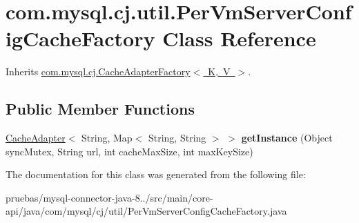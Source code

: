 \hypertarget{classcom_1_1mysql_1_1cj_1_1util_1_1_per_vm_server_config_cache_factory}{}\section{com.\+mysql.\+cj.\+util.\+Per\+Vm\+Server\+Config\+Cache\+Factory Class Reference}
\label{classcom_1_1mysql_1_1cj_1_1util_1_1_per_vm_server_config_cache_factory}


Inherits \mbox{\hyperlink{interfacecom_1_1mysql_1_1cj_1_1_cache_adapter_factory}{com.\+mysql.\+cj.\+Cache\+Adapter\+Factory$<$ K, V $>$}}.

\subsection*{Public Member Functions}
\begin{DoxyCompactItemize}
\item 
\mbox{\label{classcom_1_1mysql_1_1cj_1_1util_1_1_per_vm_server_config_cache_factory_a3d72d677ff8a942061bf2d6f8695c88d}} 
\mbox{\hyperlink{interfacecom_1_1mysql_1_1cj_1_1_cache_adapter}{Cache\+Adapter}}$<$ String, Map$<$ String, String $>$ $>$ {\bfseries get\+Instance} (Object sync\+Mutex, String url, int cache\+Max\+Size, int max\+Key\+Size)
\end{DoxyCompactItemize}


The documentation for this class was generated from the following file\+:\begin{DoxyCompactItemize}
\item 
pruebas/mysql-\/connector-\/java-\/8../src/main/core-\/api/java/com/mysql/cj/util/Per\+Vm\+Server\+Config\+Cache\+Factory.\+java\end{DoxyCompactItemize}
